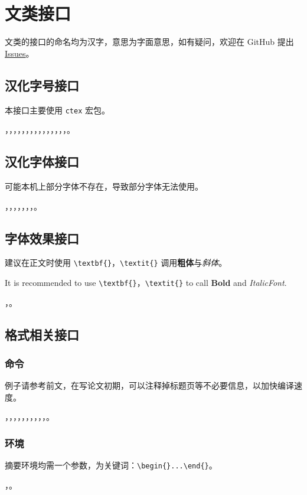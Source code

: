 \section{文类接口}
文类的接口的命名均为汉字，意思为字面意思，如有疑问，欢迎在 GitHub 提出 \href{https://github.com/Iydon/sustechthesis/issues}{Issues}。

\subsection{汉化字号接口}
本接口主要使用 \texttt{ctex} 宏包。

，，，，，，，，，，，，，，，。


\subsection{汉化字体接口}
可能本机上部分字体不存在，导致部分字体无法使用。

，，，，，，，。


\subsection{字体效果接口}

建议在正文时使用 \verb|\textbf{}|，\verb|\textit{}| 调用\textbf{粗体}与\textit{斜体}。

It is recommended to use \verb|\textbf{}|，\verb|\textit{}| to call \textbf{Bold} and \textit{ItalicFont}.

，。


\subsection{格式相关接口}
\subsubsection{命令}
例子请参考前文，在写论文初期，可以注释掉标题页等不必要信息，以加快编译速度。

，，，，，，，，，，。

\subsubsection{环境}
摘要环境均需一个参数，为关键词：\verb|\begin{}...\end{}|。

，。
